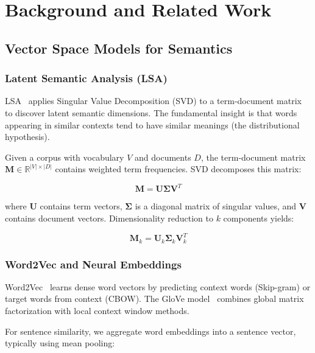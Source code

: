\documentclass[11pt,a4paper]{article}
\begin{document}
\section{Background and Related Work}

\subsection{Vector Space Models for Semantics}

\subsubsection{Latent Semantic Analysis (LSA)}

LSA~\citep{deerwester1990indexing} applies Singular Value Decomposition (SVD) to a term-document matrix to discover latent semantic dimensions. The fundamental insight is that words appearing in similar contexts tend to have similar meanings (the distributional hypothesis).

Given a corpus with vocabulary $V$ and documents $D$, the term-document matrix $\mathbf{M} \in \mathbb{R}^{|V| \times |D|}$ contains weighted term frequencies. SVD decomposes this matrix:

\begin{equation}
\mathbf{M} = \mathbf{U} \boldsymbol{\Sigma} \mathbf{V}^T
\end{equation}

where $\mathbf{U}$ contains term vectors, $\boldsymbol{\Sigma}$ is a diagonal matrix of singular values, and $\mathbf{V}$ contains document vectors. Dimensionality reduction to $k$ components yields:

\begin{equation}
\mathbf{M}_k = \mathbf{U}_k \boldsymbol{\Sigma}_k \mathbf{V}_k^T
\end{equation}

\subsubsection{Word2Vec and Neural Embeddings}

Word2Vec~\citep{mikolov2013efficient} learns dense word vectors by predicting context words (Skip-gram) or target words from context (CBOW). The GloVe model~\citep{pennington2014glove} combines global matrix factorization with local context window methods.

For sentence similarity, we aggregate word embeddings into a sentence vector, typically using mean pooling:
\end{document}
